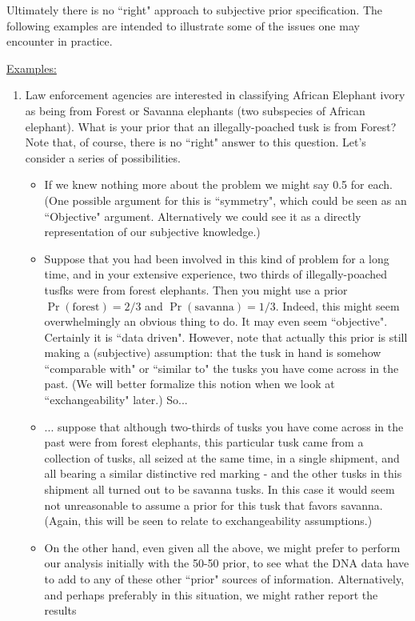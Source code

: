 \documentclass[12pt]{article}
\begin{document}
Ultimately there is no ``right" approach to subjective prior specification. The following examples are intended to illustrate some of the issues one
may encounter in practice.

\underline{Examples:}
  
\begin{enumerate}
  \item Law enforcement agencies are interested in classifying African Elephant ivory as being from Forest or Savanna elephants (two subspecies of African elephant). What is your prior that an illegally-poached tusk is from Forest? Note that, of course, there is no ``right" answer to this question. Let's consider a series of possibilities.
  \begin{itemize}
  \item If we knew nothing more about the problem we might say 0.5 for each. (One possible argument for this is ``symmetry", which could
  be seen as an ``Objective" argument. Alternatively we could see it as a directly representation of our subjective knowledge.)
  \item Suppose that you had been involved in this kind of problem for a long time, and in your extensive experience, two thirds of illegally-poached tusfks
  were from forest elephants. Then you might use a prior $\Pr(\text{forest}) = 2/3$ and $\Pr(\text{savanna}) = 1/3$.
  Indeed, this might seem overwhelmingly an obvious thing to do. It may even seem ``objective". Certainly it is ``data driven". However, note
  that actually this prior is still making a (subjective) assumption: that the tusk in hand is somehow ``comparable with" or ``similar to" the tusks
  you have come across in the past. (We will better formalize this notion when we look at ``exchangeability" later.)  So...
  \item ... suppose that although two-thirds of tusks you have  come across in the past were from forest elephants, this particular tusk came
  from a collection of tusks, all seized at the same time, in a single shipment, and all bearing a similar distinctive red marking - and the other tusks in this shipment
  all turned out to be savanna tusks. In this case it would seem not unreasonable to assume a prior for this tusk that favors savanna. (Again, this will
  be seen to relate to exchangeability assumptions.)
  \item On the other hand, even given all the above, we might prefer to perform our analysis initially with the 50-50 prior, to see what the DNA data have
  to add to any of these other ``prior" sources of information. Alternatively, and perhaps preferably in this situation, we might rather report the results

\end{itemize}
\end{enumerate}
\end{document}
